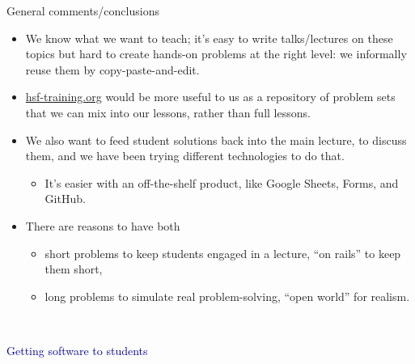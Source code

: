\documentclass[aspectratio=169]{beamer}
\begin{document}
\begin{frame}{General comments/conclusions}
\large
\vspace{0.5 cm}
\begin{itemize}\setlength{\itemsep}{0.45 cm}
\item<1-> We know what we want to teach; it's easy to write talks/lectures on these topics but hard to create hands-on problems at the right level: we informally reuse them by copy-paste-and-edit.
\item<2-> \textcolor{blue}{\url{hsf-training.org}} would be more useful to us as a repository of problem sets that we can mix into our lessons, rather than full lessons.
\item<3-> We also want to feed student solutions back into the main lecture, to discuss them, and we have been trying different technologies to do that.
\begin{itemize}
\item It's easier with an off-the-shelf product, like Google Sheets, Forms, and GitHub.
\end{itemize}
\item<4-> There are reasons to have both
\begin{itemize}
\item short problems to keep students engaged in a lecture, ``on rails'' to keep them short,
\item long problems to simulate real problem-solving, ``open world'' for realism.
\end{itemize}

\end{itemize}
\end{frame}

\begin{frame}{\mbox{ }}
\LARGE
\begin{center}
\textcolor{darkblue}{Getting software to students}
\end{center}
\end{frame}
\end{document}
